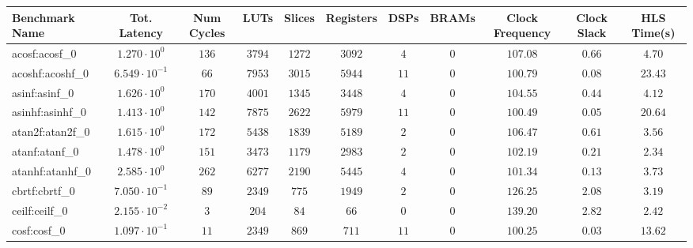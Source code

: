 \begin{tabular}{|l|c|c|c|c|c|c|c|c|c|c|}
\hline
Benchmark Name               & Tot. Latency            & Num Cycles & LUTs       & Slices    & Registers & DSPs    & BRAMs & Clock Frequency & Clock Slack & HLS Time(s) \\
\hline
acosf:acosf\_0               & $ 1.270 \cdot 10^{0}  $ & $ 136    $ & $ 3794   $ & $ 1272  $ & $ 3092  $ & $ 4   $ & $ 0 $ & $ 107.08      $ & $ 0.66    $ & $ 4.70    $ \\
acoshf:acoshf\_0             & $ 6.549 \cdot 10^{-1} $ & $ 66     $ & $ 7953   $ & $ 3015  $ & $ 5944  $ & $ 11  $ & $ 0 $ & $ 100.79      $ & $ 0.08    $ & $ 23.43   $ \\
asinf:asinf\_0               & $ 1.626 \cdot 10^{0}  $ & $ 170    $ & $ 4001   $ & $ 1345  $ & $ 3448  $ & $ 4   $ & $ 0 $ & $ 104.55      $ & $ 0.44    $ & $ 4.12    $ \\
asinhf:asinhf\_0             & $ 1.413 \cdot 10^{0}  $ & $ 142    $ & $ 7875   $ & $ 2622  $ & $ 5979  $ & $ 11  $ & $ 0 $ & $ 100.49      $ & $ 0.05    $ & $ 20.64   $ \\
atan2f:atan2f\_0             & $ 1.615 \cdot 10^{0}  $ & $ 172    $ & $ 5438   $ & $ 1839  $ & $ 5189  $ & $ 2   $ & $ 0 $ & $ 106.47      $ & $ 0.61    $ & $ 3.56    $ \\
atanf:atanf\_0               & $ 1.478 \cdot 10^{0}  $ & $ 151    $ & $ 3473   $ & $ 1179  $ & $ 2983  $ & $ 2   $ & $ 0 $ & $ 102.19      $ & $ 0.21    $ & $ 2.34    $ \\
atanhf:atanhf\_0             & $ 2.585 \cdot 10^{0}  $ & $ 262    $ & $ 6277   $ & $ 2190  $ & $ 5445  $ & $ 4   $ & $ 0 $ & $ 101.34      $ & $ 0.13    $ & $ 3.73    $ \\
cbrtf:cbrtf\_0               & $ 7.050 \cdot 10^{-1} $ & $ 89     $ & $ 2349   $ & $ 775   $ & $ 1949  $ & $ 2   $ & $ 0 $ & $ 126.25      $ & $ 2.08    $ & $ 3.19    $ \\
ceilf:ceilf\_0               & $ 2.155 \cdot 10^{-2} $ & $ 3      $ & $ 204    $ & $ 84    $ & $ 66    $ & $ 0   $ & $ 0 $ & $ 139.20      $ & $ 2.82    $ & $ 2.42    $ \\
cosf:cosf\_0                 & $ 1.097 \cdot 10^{-1} $ & $ 11     $ & $ 2349   $ & $ 869   $ & $ 711   $ & $ 11  $ & $ 0 $ & $ 100.25      $ & $ 0.03    $ & $ 13.62   $ \\

\end{tabular}
